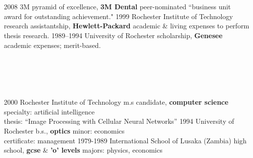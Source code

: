 \documentclass[]{friggeri-cv} %
\begin{document}
\section{{} {} {\normalsize {}~~}}

\begin{entrylist}
\entry
{2008}
{3M}
{pyramid of excellence, {\textbf{\color{DarkGray}3M Dental}}}
{peer-nominated ``business unit award for outstanding achievement."}
\entry
{1999}
{Rochester Institute of Technology}
{research assistantship, {\textbf{\color{DarkGray}Hewlett-Packard}}}
{academic \& living expenses to perform thesis research.}
\entry
{1989--1994}
{University of Rochester}
{scholarship, {\textbf{\color{DarkGray}Genesee}}}
{academic expenses; merit-based.}
\end{entrylist}



\section{{} {} {\normalsize {}~~}}

\begin{entrylist}
\entry
{2000}
{Rochester Institute of Technology}
{m.s candidate, {\textbf{\color{DarkGray}computer science}}}
{specialty: artificial intelligence\\
thesis: ``Image Processing with Cellular Neural Networks''}
\entry
{1994}
{University of Rochester}
{b.s., {\textbf{\color{DarkGray}optics}}}
{minor: economics\\
certificate: management} 
\entry
{1979-1989}
{International School of Lusaka (Zambia)}
{high school, {\textbf{\color{DarkGray}gcse}} \& {\textbf{\color{DarkGray}'o' levels}}}
{majors: physics, economics}
\end{entrylist}
\end{document}
